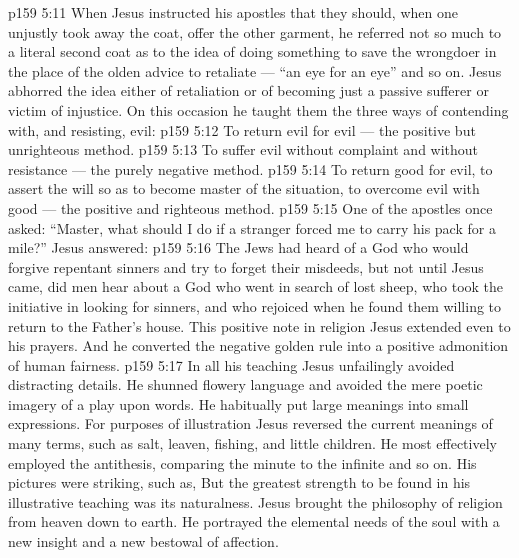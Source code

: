 \vs p159 5:11 When Jesus instructed his apostles that they should, when one unjustly took away the coat, offer the other garment, he referred not so much to a literal second coat as to the idea of doing something  to save the wrongdoer in the place of the olden advice to retaliate --- “an eye for an eye” and so on. Jesus abhorred the idea either of retaliation or of becoming just a passive sufferer or victim of injustice. On this occasion he taught them the three ways of contending with, and resisting, evil:
\vs p159 5:12 \bibnobreakspace To return evil for evil --- the positive but unrighteous method.
\vs p159 5:13 \bibnobreakspace To suffer evil without complaint and without resistance --- the purely negative method.
\vs p159 5:14 \bibnobreakspace To return good for evil, to assert the will so as to become master of the situation, to overcome evil with good --- the positive and righteous method.
\vs p159 5:15 \pc One of the apostles once asked: “Master, what should I do if a stranger forced me to carry his pack for a mile?” Jesus answered: 
\vs p159 5:16 The Jews had heard of a God who would forgive repentant sinners and try to forget their misdeeds, but not until Jesus came, did men hear about a God who went in search of lost sheep, who took the initiative in looking for sinners, and who rejoiced when he found them willing to return to the Father’s house. This positive note in religion Jesus extended even to his prayers. And he converted the negative golden rule into a positive admonition of human fairness.
\vs p159 5:17 In all his teaching Jesus unfailingly avoided distracting details. He shunned flowery language and avoided the mere poetic imagery of a play upon words. He habitually put large meanings into small expressions. For purposes of illustration Jesus reversed the current meanings of many terms, such as salt, leaven, fishing, and little children. He most effectively employed the antithesis, comparing the minute to the infinite and so on. His pictures were striking, such as,  But the greatest strength to be found in his illustrative teaching was its naturalness. Jesus brought the philosophy of religion from heaven down to earth. He portrayed the elemental needs of the soul with a new insight and a new bestowal of affection.

